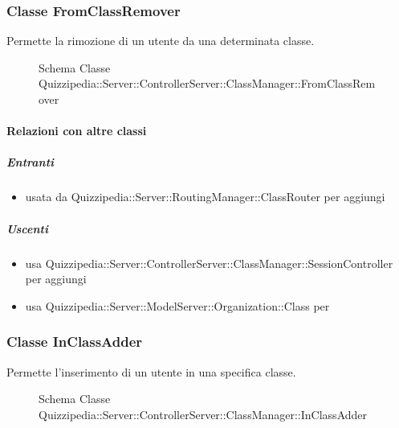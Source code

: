 \subsubsection{Classe FromClassRemover}
Permette la rimozione di un utente da una determinata classe.
\begin{figure}[H]
\centering
\noindent{}
\caption[Schema Classe FromClassRemover]{Schema Classe Quizzipedia::Server::ControllerServer::ClassManager::FromClassRemover}
\end{figure}
\paragraph{Relazioni con altre classi}
\subparagraph{Entranti}
\begin{itemize}
\item usata da Quizzipedia::Server::RoutingManager::ClassRouter per aggiungi
\end{itemize}
\subparagraph{Uscenti}
\begin{itemize}
\item usa Quizzipedia::Server::ControllerServer::ClassManager::SessionController per aggiungi
\item usa Quizzipedia::Server::ModelServer::Organization::Class per 
\end{itemize}
\subsubsection{Classe InClassAdder}
Permette l'inserimento di un utente in una specifica classe.
\begin{figure}[H]
\centering
\noindent{}
\caption[Schema Classe InClassAdder]{Schema Classe Quizzipedia::Server::ControllerServer::ClassManager::InClassAdder}
\end{figure}
